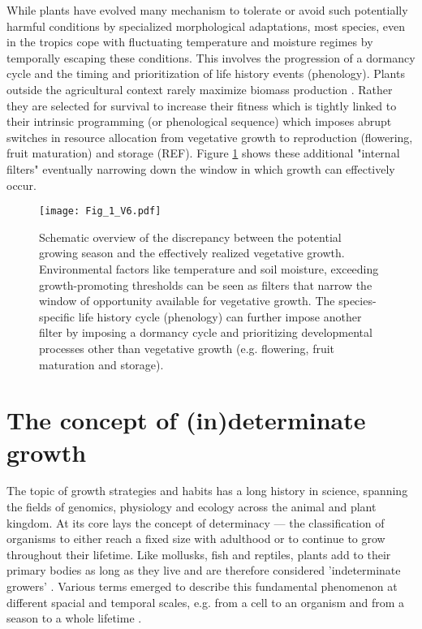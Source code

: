 \documentclass{article}
\begin{document}
		While plants have evolved many mechanism to tolerate or avoid such potentially harmful conditions by specialized morphological adaptations, most species, even in the tropics cope with fluctuating temperature and moisture regimes by temporally escaping these conditions. This involves the progression of a dormancy cycle and the timing and prioritization of life history events (phenology). Plants outside the agricultural context rarely maximize biomass production \citep{kornerConceptsEmpiricalPlant2018}. Rather they are selected for survival to increase their fitness which is tightly linked to their intrinsic programming (or phenological sequence) which imposes abrupt switches in resource allocation from vegetative growth to reproduction (flowering, fruit maturation) and storage (REF). Figure \ref{fig:fig_1xxx} shows these additional "internal filters" eventually narrowing down the window in which growth can effectively occur.\\
		
		
		
								\begin{figure}
								\centering
								\texttt{[image: Fig\_1\_V6.pdf]} 
								\caption{Schematic overview of the discrepancy between the potential growing season and the effectively realized vegetative growth. Environmental factors like temperature and soil moisture, exceeding growth-promoting thresholds can be seen as filters that narrow the window of opportunity available for vegetative growth. The species-specific life history cycle (phenology) can further impose another filter by imposing a dormancy cycle and prioritizing developmental processes other than vegetative growth (e.g. flowering, fruit maturation and storage). }
								\label{fig:fig_1xxx}
							\end{figure}

	
\section*{The concept of (in)determinate growth}
The topic of growth strategies and habits has a long history in science, spanning the fields of genomics, physiology and ecology across the animal and plant kingdom. At its core lays the concept of determinacy --- the classification of organisms to either reach a fixed size with adulthood or to continue to grow throughout their lifetime. Like mollusks, fish and reptiles, plants add to their primary bodies as long as they live and are therefore considered 'indeterminate growers' \citep{ejsmondHowTimeGrowth2010}. Various terms emerged to describe this fundamental phenomenon at different spacial and temporal scales, e.g. from a cell to an organism and from a season to a whole lifetime \citep{mcdanielInductionDeterminationDevelopmental1992a, karkachTrajectoriesModelsIndividual2006}. \\
\end{document}
